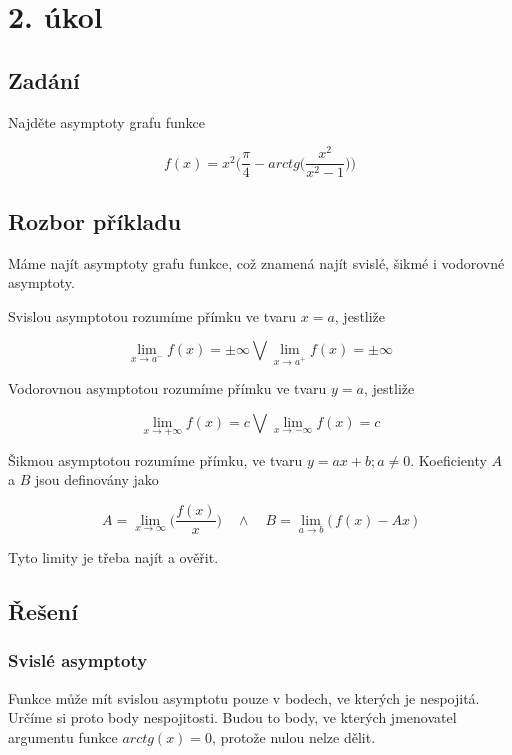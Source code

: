 \section{2. úkol}
\subsection{Zadání}

Najděte asymptoty grafu funkce 

\begin{displaymath}
f(x) = x^2\Big(\frac{\pi}{4}-arctg\Big(\frac{x^2}{x^2-1}\Big)\Big)
\end{displaymath}

\subsection{Rozbor příkladu}

Máme najít asymptoty grafu funkce, což znamená najít svislé, šikmé i vodorovné asymptoty.

Svislou asymptotou rozumíme přímku ve tvaru $x=a$, jestliže 

\begin{displaymath}
\lim_{x \to a^-} f(x) = \pm \infty \bigvee\lim_{x \to a^+} f(x) = \pm \infty
\end{displaymath}

Vodorovnou asymptotou rozumíme přímku ve tvaru $y=a$, jestliže

\begin{displaymath}
\lim_{x \to +\infty} f(x) = c \bigvee\lim_{x \to - \infty} f(x) = c
\end{displaymath}

Šikmou asymptotou rozumíme přímku, ve tvaru $y=ax+b;a \neq 0$. Koeficienty $A$ a $B$ jsou definovány jako

\begin{displaymath}
A = \lim_{x \rightarrow \infty}\Big( \frac{f(x)}{x}\Big) \quad\wedge\quad B = \lim_{a \rightarrow b}\big(\,f(x)-Ax\,\big)
\end{displaymath}

Tyto limity je třeba najít a ověřit.

\subsection{Řešení}

\subsubsection{Svislé asymptoty}
Funkce může mít svislou asymptotu pouze v bodech, ve kterých je nespojitá. Určíme si proto body nespojitosti. Budou to body, ve kterých jmenovatel argumentu funkce $arctg(x) = 0$, protože nulou nelze dělit.

